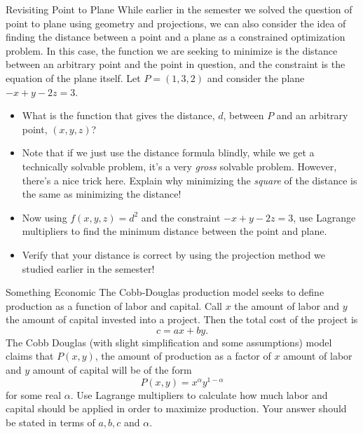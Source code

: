 \begin{exercise}{Revisiting Point to Plane}
While earlier in the semester we solved the question of point to plane using geometry and projections, we can also consider the idea of finding the distance between a point and a plane as a constrained optimization problem. In this case, the function we are seeking to minimize is the distance between an arbitrary point and the point in question, and the constraint is the equation of the plane itself. Let $P=(1,3,2)$ and consider the plane $-x+y-2z=3$. 
\vspace{1em}
\begin{itemize}
\item What is the function that gives the distance, $d$, between $P$ and an arbitrary point, $(x,y,z)$? 
\vspace{1em}
\item Note that if we just use the distance formula blindly, while we get a technically solvable problem, it's a very \textit{gross} solvable problem. However, there's a nice trick here. Explain why minimizing the \textit{square} of the distance is the same as minimizing the distance! 
\vspace{1em}
\item Now using $f(x,y,z)=d^2$ and the constraint $-x+y-2z=3$, use Lagrange multipliers to find the minimum distance between the point and plane. 
\vspace{1em}
\item Verify that your distance is correct by using the projection method we studied earlier in the semester!
\end{itemize}
\end{exercise}

\begin{exercise}{Something Economic}
The Cobb-Douglas production model seeks to define production as a function of labor and capital. Call $x$ the amount of labor and $y$ the amount of capital invested into a project. Then the total cost of the project is $$c=ax+by.$$ The Cobb Douglas (with slight simplification and some assumptions) model claims that $P(x,y)$, the amount of production as a factor of $x$ amount of labor and $y$ amount of capital will be of the form $$P(x,y)=x^\alpha y^{1-\alpha} $$ for some real $\alpha$. Use Lagrange multipliers to calculate how much labor and capital should be applied in order to maximize production. Your answer should be stated in terms of $a,b,c$ and $\alpha$.
\end{exercise}
